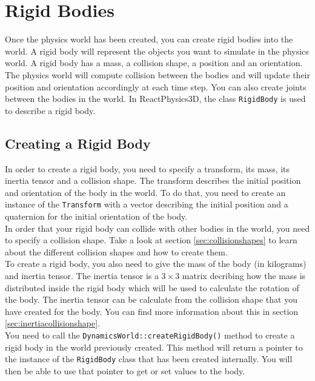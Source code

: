 \documentclass[a4paper,12pt]{article}
\begin{document}
    \section{Rigid Bodies}

    Once the physics world has been created, you can create rigid bodies into the world. A rigid body will represent the objects you want to simulate in the physics world.
    A rigid body has a mass, a collision shape, a position and an orientation. The physics world will compute collision between the bodies and will update their position and
    orientation accordingly at each time step. You can also create joints between the bodies in the world. In ReactPhysics3D, the class \texttt{RigidBody} is used to describe a rigid body.

    \subsection{Creating a Rigid Body}

    In order to create a rigid body, you need to specify a transform, its mass, its inertia tensor and a collision shape. The transform describes the initial
    position and orientation of the body in the world. To do that, you need to create an instance of the \texttt{Transform} with a vector describing the
    initial position and a quaternion for the initial orientation of the body. \\

    In order that your rigid body can collide with other bodies in the world, you need to specify a collision shape. Take a look at section \ref{sec:collisionshapes} to learn about the
    different collision shapes and how to create them. \\

    To create a rigid body, you also need to give the mass of the body (in kilograms) and inertia tensor. The inertia tensor is a $3 \times 3$ matrix decribing how the mass is
    distributed inside the rigid body which will be used to calculate the rotation of the body. The inertia tensor can be calculate from the collision shape that you have created for the
    body. You can find more information about this in section \ref{sec:inertiacollisionshape}. \\

    You need to call the \texttt{DynamicsWorld::createRigidBody()} method to create a rigid body in the world previously created. This method will return a pointer to the instance
    of the \texttt{RigidBody} class that has been created internally. You will then be able to use that pointer to get or set values to the body. \\
\end{document}
